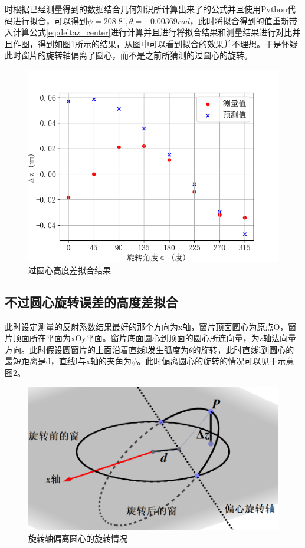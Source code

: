 \documentclass[master]{thesis-uestc}
\begin{document}
时根据已经测量得到的数据结合几何知识所计算出来了的公式并且使用Python代码进行拟合，可以得到\( \psi = 208.8 ^ \circ, \theta = -0.00369rad \)，此时将拟合得到的值重新带入计算公式\ref{eq:deltaz_center}进行计算并且进行将拟合结果和测量结果进行对比并且作图，得到如图\ref{fig:过圆心高度差拟合结果}所示的结果，从图中可以看到拟合的效果并不理想。于是怀疑此时窗片的旋转轴偏离了圆心，而不是之前所猜测的过圆心的旋转。
\begin{figure}[!htb]
    \centering
    \includegraphics[width=0.5\linewidth]{pic/chapter5/过圆心高度差拟合.png}
    \caption{过圆心高度差拟合结果}
    \label{fig:过圆心高度差拟合结果}
\end{figure}

\subsection{不过圆心旋转误差的高度差拟合}
此时设定测量的反射系数结果最好的那个方向为x轴，窗片顶面圆心为原点O，窗片顶面所在平面为xOy平面。窗片底面圆心到顶面的圆心所连向量，为z轴法向量方向。此时假设圆窗片的上面沿着直线l发生弧度为\(\theta\)的旋转，此时直线l到圆心的最短距离是d，直线l与x轴的夹角为\(\psi\)。此时偏离圆心的旋转的情况可以见于示意图\ref{fig:旋转轴偏离圆心的旋转情况}。
\begin{figure}[!htb]
    \centering
    \includegraphics[width=0.35\linewidth]{pic/chapter5/不过圆心旋转示意图.png}
    \caption{旋转轴偏离圆心的旋转情况}
    \label{fig:旋转轴偏离圆心的旋转情况}
\end{figure}
\end{document}
